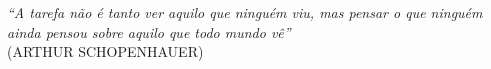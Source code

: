 \begin{epigrafe}
    \vspace*{\fill}
	\begin{flushright}
		\textit{``A tarefa não é tanto ver aquilo que ninguém viu, mas pensar o que ninguém ainda pensou sobre aquilo que todo mundo vê''} \\
		(ARTHUR SCHOPENHAUER)
	\end{flushright}
\end{epigrafe}

